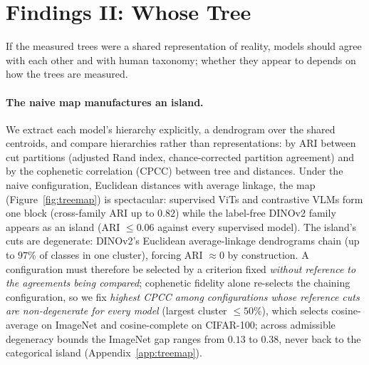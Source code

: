 \documentclass{article}
\begin{document}
\section{Findings II: Whose Tree}
\label{sec:content}

If the measured trees were a shared representation of reality, models should agree with each other and with human taxonomy; whether they appear to depends on how the trees are measured.

\paragraph{The naive map manufactures an island.} We extract each model's hierarchy explicitly, a dendrogram over the shared centroids, and compare hierarchies rather than representations: by ARI between cut partitions (adjusted Rand index, chance-corrected partition agreement) and by the cophenetic correlation (CPCC) between tree and distances. Under the naive configuration, Euclidean distances with average linkage, the map (Figure~\ref{fig:treemap}) is spectacular: supervised ViTs and contrastive VLMs form one block (cross-family ARI up to $0.82$) while the label-free DINOv2 family appears as an island (ARI $\le 0.06$ against every supervised model). The island's cuts are degenerate: DINOv2's Euclidean average-linkage dendrograms chain (up to $97\%$ of classes in one cluster), forcing ARI $\approx 0$ by construction. A configuration must therefore be selected by a criterion fixed \emph{without reference to the agreements being compared}; cophenetic fidelity alone re-selects the chaining configuration, so we fix \emph{highest CPCC among configurations whose reference cuts are non-degenerate for every model} (largest cluster $\le 50\%$), which selects cosine-average on ImageNet and cosine-complete on CIFAR-100; across admissible degeneracy bounds the ImageNet gap ranges from $0.13$ to $0.38$, never back to the categorical island (Appendix~\ref{app:treemap}). %
\end{document}
